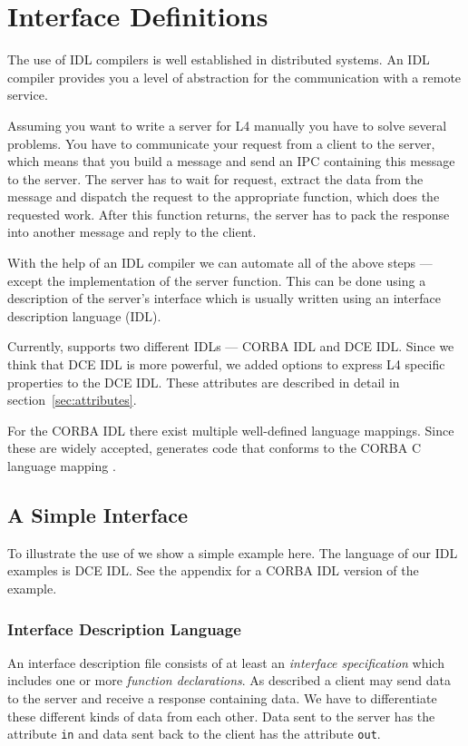 \chapter{Interface Definitions}
\label{section1}

The use of IDL compilers is well established 
in distributed systems. An IDL compiler provides you
a level of abstraction for the communication with a 
remote service.

Assuming you want to write a server for L4 manually you
have to solve several problems. You have to communicate
your request from a client to the server, which means that you
build a message and send an IPC containing this message
to the server. The server has to wait for request,
extract the data from the message and dispatch the
request to the appropriate function, which does the
requested work. After this function returns, the server
has to pack the response into another message and reply
to the client.

With the help of an IDL compiler we can automate all of the
above steps --- except the implementation of the server
function. This can be done using a description of the 
server's interface which is usually written using an
interface description language (IDL).

Currently, \dice{} supports two different IDLs --- CORBA 
IDL and DCE IDL. Since we think that DCE IDL is more
powerful, we added options to express
L4 specific properties to the DCE IDL. These attributes
are described in detail in section~\ref{sec:attributes}.

For the CORBA IDL there exist multiple well-defined 
language mappings. Since these are widely accepted,
\dice{} generates code that conforms to the CORBA C
language mapping \cite{corba-clm}.

\section{A Simple Interface}

To illustrate the use of \dice{} we show a simple example
here. The language of our IDL examples is DCE IDL. See
the appendix for a CORBA IDL version of the example.

\subsection{Interface Description Language}
An interface description file consists of at least an {\em interface
specification} which includes one or more {\em function declarations}.
As described a client may send data to the server and
receive a response containing data. We have to differentiate
these different kinds of data from each other. Data sent to
the server has the attribute \verb|in| and data sent back to
the client has the attribute \verb|out|.

